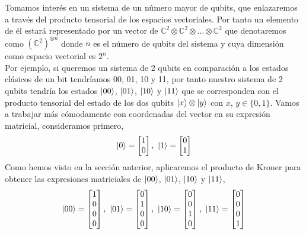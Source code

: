 \documentclass[a4paper]{article}
\numberwithin{equation}{section}
\begin{document}
Tomamos interés en un sistema de un número mayor de qubits, que enlazaremos a través del producto tensorial de los espacios vectoriales. Por tanto un elemento de él estará representado por un vector de $\mathbb{C}^2 \otimes \mathbb{C}^2 \otimes \ldots \otimes \mathbb{C}^2$ que denotaremos como $(\mathbb{C}^2)^{\otimes n}$ donde $n$ es el número de qubits del sistema y cuya dimensión como espacio vectorial es $2^n$.\\
\linebreak
Por ejemplo, si queremos un sistema de 2 qubits en comparación a los estados clásicos de un bit tendríamos 00, 01, 10 y 11, por tanto nuestro sistema de 2 qubits tendría los estados $\ket{00}$, $\ket{01}$, $\ket{10}$ y $\ket{11}$ que se corresponden con el producto tensorial del estado de los dos qubits $\ket{x}\otimes\ket{y}$ con $x$, $y\in \lbrace 0, 1\rbrace$.
Vamos a trabajar más cómodamente con coordenadas del vector en su expresión matricial, consideramos primero,
\begin{equation}
\ket{0} = \begin{bmatrix}
	1 \\ 0
\end{bmatrix}, \ 
\ket{1} = \begin{bmatrix}
	0 \\ 1
\end{bmatrix}
\end{equation}
Como hemos visto en la sección anterior, aplicaremos el producto de  Kroner para obtener las expresiones matriciales de $\ket{00}$, $\ket{01}$, $\ket{10}$ y $\ket{11}$,
\begin{equation}
\ket{00} =
\begin{bmatrix}
	1 \\ 0 \\ 0 \\ 0
\end{bmatrix}, \ 
\ket{01} =
\begin{bmatrix}
	0 \\ 1 \\ 0 \\ 0
\end{bmatrix}, \ 
\ket{10} =
\begin{bmatrix}
	0 \\ 0 \\ 1 \\ 0
\end{bmatrix}, \ 
\ket{11} =
\begin{bmatrix}
	0 \\ 0 \\ 0 \\ 1
\end{bmatrix}
\end{equation}
\end{document}
